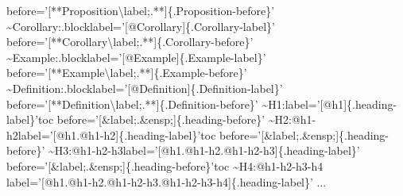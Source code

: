 \documentclass{book}
\begin{document}
\begin{mdPre}[class={para-block,pre-fenced},data-line={3829},data-line-code={3830}]
{before={'}[**Proposition{\textbackslash}label;.**]\{.Proposition-before\}{'}\prebr{}
{\textasciitilde}Corollary:.blocklabel={'}[@Corollary]\{.Corollary-label\}{'}\prebr{}
before={'}[**Corollary{\textbackslash}label;.**]\{.Corollary-before\}{'}\prebr{}
{\textasciitilde}Example:.blocklabel={'}[@Example]\{.Example-label\}{'}\prebr{}
before={'}[**Example{\textbackslash}label;.**]\{.Example-before\}{'}\prebr{}
{\textasciitilde}Definition:.blocklabel={'}[@Definition]\{.Definition-label\}{'}\prebr{}
before={'}[**Definition{\textbackslash}label;.**]\{.Definition-before\}{'}\prebr{}
\prebr{}
{\textasciitilde}H1:label={'}[@h1]\{.heading-label\}{'}toc\prebr{}
before={'}[{\&}label;.{\&}ensp;]\{.heading-before\}{'}\prebr{}
{\textasciitilde}H2:@h1-h2label={'}[@h1.@h1-h2]\{.heading-label\}{'}toc\prebr{}
before={'}[{\&}label;.{\&}ensp;]\{.heading-before\}{'}\prebr{}
{\textasciitilde}H3:@h1-h2-h3label={'}[@h1.@h1-h2.@h1-h2-h3]\{.heading-label\}{'}\prebr{}
before={'}[{\&}label;.{\&}ensp;]\{.heading-before\}{'}toc\prebr{}
{\textasciitilde}H4:@h1-h2-h3-h4\prebr{}
label={'}[@h1.@h1-h2.@h1-h2-h3.@h1-h2-h3-h4]\{.heading-label\}{'}\prebr{}
...}%
\end{mdPre}%
\end{document}
